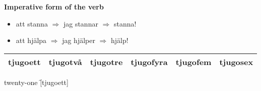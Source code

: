 
\begin{flushleft}
    \textbf{Imperative form of the verb}
    \begin{itemize}
        \item att stanna $\Rightarrow$ jag stannar $\Rightarrow$ stanna!
        \item att hjälpa $\Rightarrow$ jag hjälper $\Rightarrow$ hjälp!
    \end{itemize}
\end{flushleft}

\begin{center}
    \begin{tabular}{|c c c c c c|}
        \hline
        tjugoett & tjugotvå & tjugotre & tjugofyra & tjugofem & tjugosex \\
        \hline
    \end{tabular}
\end{center}

\begin{questions}
    \begin{multicols}{2}
        \raggedcolumns
        \question twenty-one \f[tjugoett]
    \end{multicols}
\end{questions}